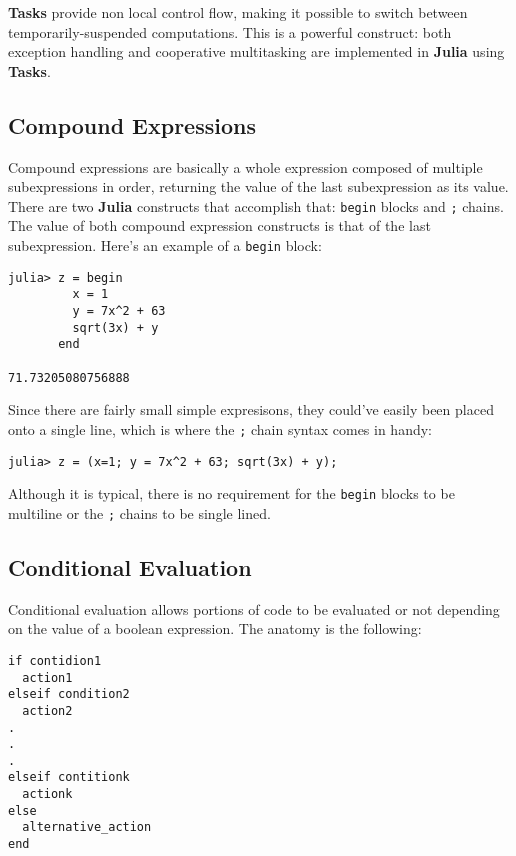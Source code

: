 \documentclass[
]{article}
\begin{document}
\textbf{Tasks} provide non local control flow, making it possible to
switch between temporarily-suspended computations. This is a powerful
construct: both exception handling and cooperative multitasking are
implemented in \textbf{Julia} using \textbf{Tasks}.

\hypertarget{compound-expressions}{%
\subsection{\texorpdfstring{Compound
Expressions}{Compound Expressions}}\label{compound-expressions}}

Compound expressions are basically a whole expression composed of
multiple subexpressions in order, returning the value of the last
subexpression as its value. There are two \textbf{Julia} constructs that
accomplish that: \texttt{begin} blocks and \texttt{;} chains. The value
of both compound expression constructs is that of the last
subexpression. Here's an example of a \texttt{begin} block:

\begin{verbatim}
julia> z = begin
         x = 1
         y = 7x^2 + 63
         sqrt(3x) + y
       end

71.73205080756888
\end{verbatim}

Since there are fairly small simple expresisons, they could've easily
been placed onto a single line, which is where the \texttt{;} chain
syntax comes in handy:

\begin{verbatim}
julia> z = (x=1; y = 7x^2 + 63; sqrt(3x) + y);
\end{verbatim}

Although it is typical, there is no requirement for the \texttt{begin}
blocks to be multiline or the \texttt{;} chains to be single lined.

\hypertarget{conditional-evaluation.}{%
\subsection{\texorpdfstring{Conditional
Evaluation}{Conditional Evaluation}}\label{conditional-evaluation.}}

Conditional evaluation allows portions of code to be evaluated or not
depending on the value of a boolean expression. The anatomy is the
following:

\begin{verbatim}
if contidion1
  action1
elseif condition2
  action2
.
.
.
elseif contitionk
  actionk
else
  alternative_action
end
\end{verbatim}
\end{document}
